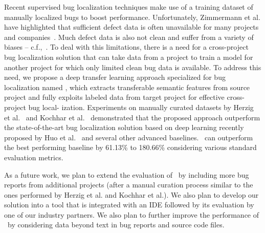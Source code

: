 Recent supervised bug localization techniques make use of a training dataset of manually localized bugs to boost performance. Unfortunately, Zimmermann et al. have highlighted that sufficient defect data is often unavailable for many projects and companies~\cite{ZimmermannNGGM09}. Much defect data is also not clean and suffer from a variety of biases -- c.f.,~\cite{HerzigJZ13,KochharTL14,BachmannBRDB10,BirdBADBFD09}. To deal with this limitations, there is a need for a cross-project bug localization solution that can take data from a project to train a model for another project for which only limited clean bug data is available. To address this need, we propose a deep transfer learning approach specialized for bug localization named \TRANPCNN, which extracts transferable semantic features from source project and fully exploits labeled data from target project for effective cross-project bug local- ization. Experiments on manually curated datasets by Herzig et al.~\cite{HerzigJZ13} and Kochhar et al.~\cite{KochharTL14} demonstrated that the proposed approach outperform the state-of-the-art bug localization solution based on deep learning recently proposed by Huo et al.~\cite{huo2016learning} and several other advanced baselines. \TRANPCNN\ can outperform the best performing baseline by 61.13\% to 180.66\% considering various standard evaluation metrics.

As a future work, we plan to extend the evaluation of \TRANPCNN\ by including more bug reports from additional projects (after a manual curation process similar to the ones performed by Herzig et al. and Kochhar et al.). We also plan to develop our solution into a tool that is integrated with an IDE followed by its evaluation by one of our industry partners. We also plan to further improve the performance of \TRANPCNN\ by considering data beyond text in bug reports and source code files. 
